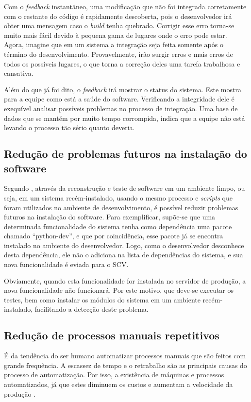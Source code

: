 Com o \textit{feedback} instantâneo, uma modificação que não foi integrada corretamente com o restante do código é rapidamente descoberta, pois o desenvolvedor irá obter uma mensagem caso o \textit{build} tenha quebrado. Corrigir esse erro torna-se muito mais fácil devido à pequena gama de lugares onde o erro pode estar. Agora, imagine que em um sistema a integração seja feita somente após o término do desenvolvimento. Provavelmente, irão surgir erros e mais erros de todos os possíveis lugares, o que torna a correção deles uma tarefa trabalhosa e cansativa.

Além do que já foi dito, o \textit{feedback} irá mostrar o status do sistema. Este mostra para a equipe como está a saúde do software. Verificando a integridade dele é exequível analisar possíveis problemas no processo de integração. Uma base de dados que se mantém por muito tempo corrompida, indica que a equipe não está levando o processo tão sério quanto deveria.

\subsection{Redução de problemas futuros na instalação do software}

Segundo , através da reconstrução e teste de software em um ambiente limpo, ou seja, em um sistema recém-instalado, usando o mesmo processo e \textit{scripts} que foram utilizados no ambiente de desenvolvimento, é possível reduzir problemas futuros na instalação do software. Para exemplificar, supõe-se que uma determinada funcionalidade do sistema tenha como dependência uma pacote chamado ``python-dev'', e que por coincidência, esse pacote já se encontra instalado no ambiente do desenvolvedor. Logo, como o desenvolvedor desconhece desta dependência, ele não o adiciona na lista de dependências do sistema, e sua nova funcionalidade é eviada para o SCV.

Obviamente, quando esta funcionalidade for instalada no servidor de produção, a nova funcionalidade não funcionará. Por este motivo, que deve-se executar os testes, bem como instalar os módulos do sistema em um ambiente recém-instalado, facilitando a detecção deste problema.

\subsection{Redução de processos manuais repetitivos}

É da tendência do ser humano automatizar processos manuais que são feitos com grande frequência. A escassez de tempo e o retrabalho são as principais causas do processo de automatização. Por isso, a existência de máquinas e processos automatizados, já que estes diminuem os custos e aumentam a velocidade da produção \cite{LACOMBE}.

